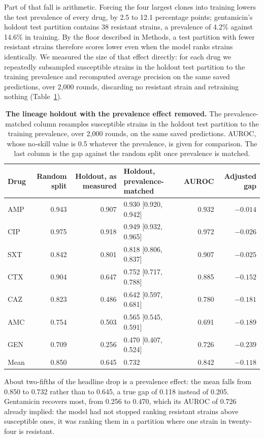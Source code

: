 Part of that fall is arithmetic. Forcing the four largest clones into training lowers the test
prevalence of every drug, by 2.5 to 12.1 percentage points; gentamicin's holdout test partition
contains 38 resistant strains, a prevalence of 4.2\% against 14.6\% in training. By the floor
described in Methods, a test partition with fewer resistant strains therefore scores lower even
when the model ranks strains identically. We measured the size of that effect
directly: for each drug we repeatedly subsampled susceptible strains in the holdout test partition
to the training prevalence and recomputed average precision on the same saved predictions, over
2,000 rounds, discarding no resistant strain and retraining nothing (Table~\ref{tab:previnv}).

\begin{table}[t]\centering\footnotesize
\setlength{\tabcolsep}{4pt}
\caption{\textbf{The lineage holdout with the prevalence effect removed.} The prevalence-matched
column resamples susceptible strains in the holdout test partition to the training prevalence, over
2,000 rounds, on the same saved predictions. AUROC, whose no-skill value is 0.5 whatever the
prevalence, is given for comparison. The last column is the gap against the random split once
prevalence is matched.}
\label{tab:previnv}
\begin{tabular}{lrrlrr}
\toprule
Drug & Random split & Holdout, as measured & Holdout, prevalence-matched & AUROC & Adjusted gap \\
\midrule
AMP & 0.943 & 0.907 & 0.930 [0.920, 0.942] & 0.932 & $-0.014$ \\
CIP & 0.975 & 0.918 & 0.949 [0.932, 0.965] & 0.972 & $-0.026$ \\
SXT & 0.842 & 0.801 & 0.818 [0.806, 0.837] & 0.907 & $-0.025$ \\
\midrule
CTX & 0.904 & 0.647 & 0.752 [0.717, 0.788] & 0.885 & $-0.152$ \\
CAZ & 0.823 & 0.486 & 0.642 [0.597, 0.681] & 0.780 & $-0.181$ \\
AMC & 0.754 & 0.503 & 0.565 [0.545, 0.591] & 0.691 & $-0.189$ \\
GEN & 0.709 & 0.256 & 0.470 [0.407, 0.524] & 0.726 & $-0.239$ \\
\midrule
Mean & 0.850 & 0.645 & 0.732 & 0.842 & $-0.118$ \\
\bottomrule
\end{tabular}
\end{table}

About two-fifths of the headline drop is a prevalence effect: the mean falls from 0.850 to 0.732
rather than to 0.645, a true gap of 0.118 instead of 0.205. Gentamicin recovers most, from 0.256 to
0.470, which its AUROC of 0.726 already implied: the model had not stopped ranking resistant strains
above susceptible ones, it was ranking them in a partition where one strain in twenty-four is
resistant.

